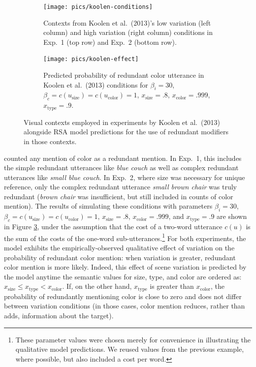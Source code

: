 \documentclass[11pt]{article}
\newcommand{\figref}[1]{Figure \ref{#1}}
\begin{document}
\begin{figure}
\begin{subfigure}{.5\textwidth}
\texttt{[image: pics/koolen-conditions]}
\caption{Contexts from Koolen et al.~(2013)'s low variation (left column) and high variation (right column) conditions in Exp.~1 (top row) and Exp.~2 (bottom row).}
\label{fig:koolencontexts}
\end{subfigure}
\begin{subfigure}{.5\textwidth}
\centering
\texttt{[image: pics/koolen-effect]}
\caption{Predicted probability of redundant color utterance in Koolen et al.~(2013) conditions for $\beta_i = 30$, $ \beta_c = c(u_{\textrm{size}}) = c(u_{\textrm{color}}) = 1$, $x_{\text{size}} = .8$, $x_{\text{color}} = .999$, $x_{\text{type}} = .9$.}
\label{fig:koolensimulationresults}
\end{subfigure}
\caption{Visual contexts employed in experiments by Koolen et al.~(2013) alongside RSA model predictions for the use of redundant modifiers in those contexts.}
\end{figure}

 counted any mention of color as a redundant mention. In Exp.~1, this includes the simple redundant utterances like \emph{blue couch} as well as complex redundant utterances like \emph{small blue couch}. In Exp.~2, where size was necessary for unique reference, only the complex redundant utterance \emph{small brown chair} was truly redundant (\emph{brown chair} was insufficient, but still included in counts of color mention).  The results of simulating these conditions with parameters $\beta_i = 30$, $ \beta_c = c(u_{\textrm{size}}) = c(u_{\textrm{color}}) = 1$, $x_{\text{size}} = .8$, $x_{\text{color}} = .999$, and $x_{\text{type}} = .9$ are shown in \figref{fig:koolensimulationresults}, under the assumption that the cost of a two-word utterance $c(u)$ is the sum of the costs of the one-word sub-utterances.\footnote{These parameter values were chosen merely for convenience in illustrating the qualitative model predictions. We reused values from the previous example, where possible, but also included a cost per word.}
For both experiments, the model exhibits the empirically-observed qualitative effect of variation on the probability of redundant color mention: when variation is greater, redundant color mention is more likely. 
Indeed, this effect of scene variation is predicted by the model anytime the semantic values for size, type, and color are ordered as: $x_{\text{size}} \leq  x_{\text{type}} < x_{\text{color}}$. If, on the other hand, $x_{\text{type}}$ is greater than $x_{\text{color}}$, the probability of redundantly mentioning color is close to zero and does not differ between variation conditions (in those cases, color mention reduces, rather than adds, information about the target). 
\end{document}
